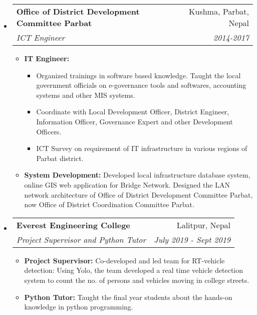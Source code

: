 \documentclass[letterpaper,11pt]{article}
\makeatletter
\newcommand{\resitem}[1]{\item #1 \vspace{-2pt}}
\newcommand{\ressubheading}[4]{
\begin{tabular*}{6.5in}{l@{\cftdotfill{\cftsecdotsep}\extracolsep{\fill}}r}
		\textbf{#1} & #2 \\
		\textit{#3} & \textit{#4} \\
\end{tabular*}\vspace{-6pt}}
\makeatother
\begin{document}
\begin{itemize}
\item[]
	\ressubheading{Office of District Development Committee Parbat}{Kushma, Parbat, Nepal}{ICT Engineer}{2014-2017}
	\begin{itemize}
		\resitem{{\bf IT Engineer:} \begin{itemize}
			\item Organized trainings in software based knowledge. Taught the local government officials on e-governance tools and softwares, accounting systems and other MIS systems. 
			\item Coordinate with Local Development Officer, District Engineer, Information Officer, Governance Expert and other Development Officers. 
			\item ICT Survey on requirement of IT infrastructure in various regions of Parbat district.
		\end{itemize} }
    \resitem{{\bf System Development:} Developed local infrastructure database system, online GIS web application for Bridge Network. Designed the LAN network architecture of Office of District Development Committee Parbat, now Office of District Coordination Committee Parbat.}
	\end{itemize}

	

\item[]
	\ressubheading{Everest Engineering College}{Lalitpur, Nepal}{Project Supervisor and Python Tutor}{July 2019 - Sept 2019}
	\begin{itemize}
			\resitem{{\bf Project Supervisor:} Co-developed and led team for RT-vehicle detection: Using Yolo, the team developed a real time vehicle detection system to count the no. of persons and vehicles moving in college streets.}
			
            \resitem{{\bf Python Tutor:} Taught the final year students about the hands-on knowledge in python programming.}
	\end{itemize}


\end{itemize}
\end{document}
